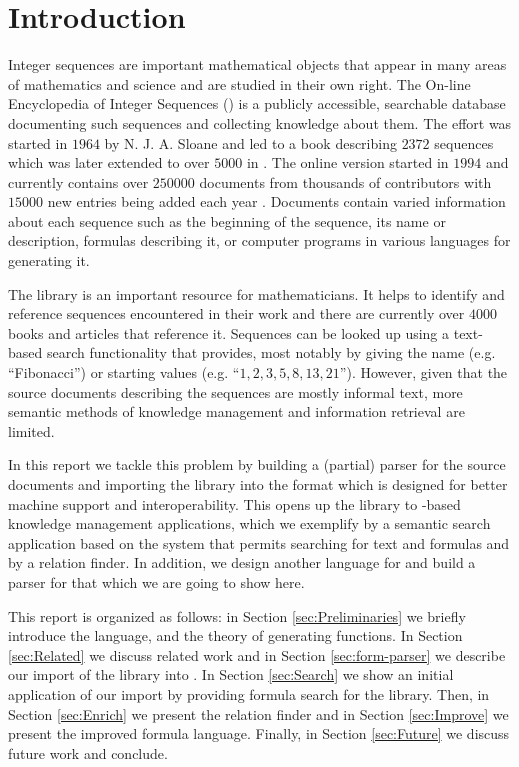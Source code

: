  \section{Introduction}

 Integer sequences are important mathematical objects that appear in many areas of
 mathematics and science and are studied in their own right.  The On-line Encyclopedia of
 Integer Sequences (\oeis) \cite{oeis} is a publicly accessible, searchable database
 documenting such sequences and collecting knowledge about them. The effort was started in
 $1964$ by N. J. A. Sloane and led to a book \cite{handbook-is} describing $2372$
 sequences which was later extended to over $5000$ in \cite{encyc-is}. The online version
 \cite{oeis-paper} started in $1994$ and currently contains over $250 000$ documents from
 thousands of contributors with $15 000$ new entries being added each year
 \cite{oeis-paper2}. Documents contain varied information about each sequence such as the
 beginning of the sequence, its name or description, formulas describing it, or computer
 programs in various languages for generating it.

 The \oeis library is an important resource for mathematicians. It helps to identify and
 reference sequences encountered in their work and there are currently over $4000$ books
 and articles that reference it.  Sequences can be looked up using a text-based search
 functionality that \oeis provides, most notably by giving the name (e.g. ``Fibonacci'')
 or starting values (e.g. ``$1,2,3,5,8,13,21$''). However, given that the source documents
 describing the sequences are mostly informal text, more semantic methods of knowledge
 management and information retrieval are limited.

 In this report we tackle this problem by building a (partial) parser for the source
 documents and importing the \oeis library into the \omdmmt format which is designed for
 better machine support and interoperability. This opens up the \oeis library to
 \omdoc-based knowledge management applications, which we exemplify by a semantic search
 application based on the \mws \cite{KohPro:man13} system that permits searching for text
 and formulas and by a relation finder.  In addition, we design another language for \oeis
 and build a parser for that which we are going to show here.

 This report is organized as follows: in Section \ref{sec:Preliminaries} we briefly
 introduce the \omdmmt language, \oeis and the theory of generating functions. In Section
 \ref{sec:Related} we discuss related work and in Section \ref{sec:form-parser} we
 describe our import of the \oeis library into \omdoc. In Section \ref{sec:Search} we show
 an initial application of our import by providing formula search for the \oeis
 library. Then, in Section \ref{sec:Enrich} we present the relation finder and in Section
 \ref{sec:Improve} we present the improved formula language. Finally, in Section
 \ref{sec:Future} we discuss future work and conclude.


